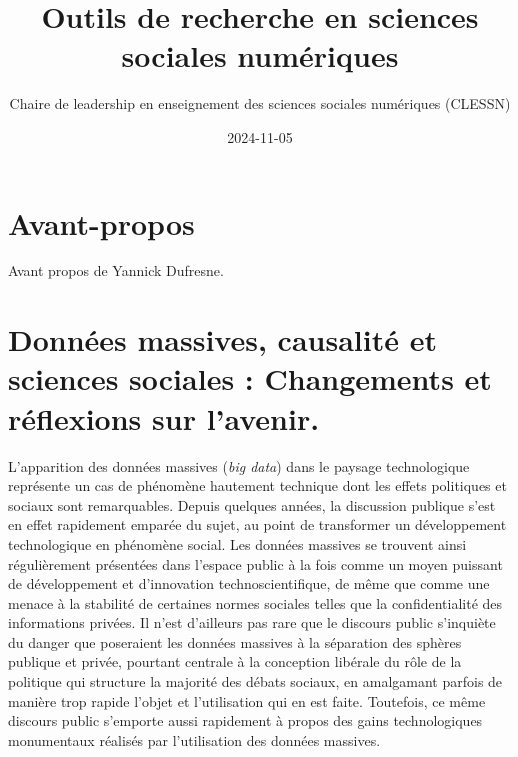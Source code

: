 \documentclass[
  letterpaper,
  DIV=11,
  numbers=noendperiod]{scrreprt}
\title{Outils de recherche en sciences sociales numériques}
\author{Chaire de leadership en enseignement des sciences sociales
numériques (CLESSN)}
\date{2024-11-05}
\renewcommand*\contentsname{Table of contents}
\newcommand\contentsname{Table of contents}
\begin{document}
\maketitle

\renewcommand*\contentsname{Table of contents}
{
\hypersetup{linkcolor=}
\setcounter{tocdepth}{2}
\tableofcontents
}

\chapter*{Avant-propos}\label{avant-propos}


Avant propos de Yannick Dufresne.


\chapter*{Données massives, causalité et sciences sociales : Changements
et réflexions sur
l'avenir.}\label{donnuxe9es-massives-causalituxe9-et-sciences-sociales-changements-et-ruxe9flexions-sur-lavenir.}


L'apparition des données massives (\emph{big data}) dans le paysage
technologique représente un cas de phénomène hautement technique dont
les effets politiques et sociaux sont remarquables. Depuis quelques
années, la discussion publique s'est en effet rapidement emparée du
sujet, au point de transformer un développement technologique en
phénomène social. Les données massives se trouvent ainsi régulièrement
présentées dans l'espace public à la fois comme un moyen puissant de
développement et d'innovation technoscientifique, de même que comme une
menace à la stabilité de certaines normes sociales telles que la
confidentialité des informations privées. Il n'est d'ailleurs pas rare
que le discours public s'inquiète du danger que poseraient les données
massives à la séparation des sphères publique et privée, pourtant
centrale à la conception libérale du rôle de la politique qui structure
la majorité des débats sociaux, en amalgamant parfois de manière trop
rapide l'objet et l'utilisation qui en est faite. Toutefois, ce même
discours public s'emporte aussi rapidement à propos des gains
technologiques monumentaux réalisés par l'utilisation des données
massives.
\end{document}
